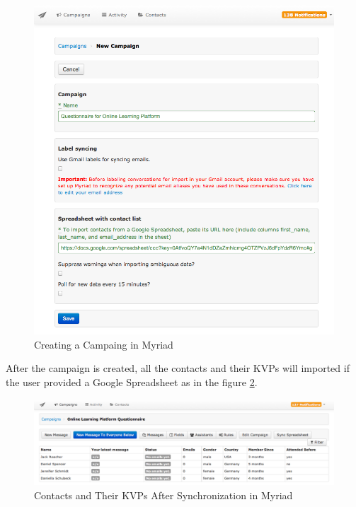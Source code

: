 \begin{figure}[htbp]
	\centering
	\includegraphics[width=1.00\textwidth]{imgs/CreateCampaign.png}
	\caption[Creating a Campaing in Myriad]{Creating a Campaing in Myriad}
	\label{fig:CreateCampaign}
\end{figure}

After the campaign is created, all the contacts and their \ac{KVP}s will imported if the user provided a Google Spreadsheet as in the figure \ref{fig:ContactListInCampaign}.

\begin{figure}[htbp]
	\centering
	\includegraphics[width=1.00\textwidth]{imgs/ContactListInCampaign.png}
	\caption[Contacts and Their \ac{KVP}s After Synchronization in Myriad]{Contacts and Their \ac{KVP}s After Synchronization in Myriad}
	\label{fig:ContactListInCampaign}
\end{figure}


